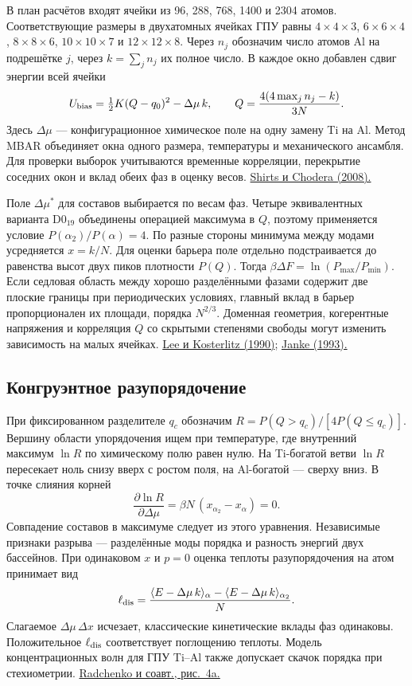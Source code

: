 \documentclass[11pt,a4paper]{article}
\begin{document}
В план расчётов входят ячейки из 96, 288, 768, 1400 и 2304 атомов. Соответствующие размеры в двухатомных ячейках ГПУ равны \(4{\times}4{\times}3\), \(6{\times}6{\times}4\), \(8{\times}8{\times}6\), \(10{\times}10{\times}7\) и \(12{\times}12{\times}8\). Через \(n_j\) обозначим число атомов Al на подрешётке \(j\), через \(k=\sum_jn_j\) их полное число. В каждое окно добавлен сдвиг энергии всей ячейки
\[
 U_{\rm bias}=\tfrac12 K(Q-q_0)^2-\Delta\mu\, k,\qquad
 Q=\frac{4(4\max_jn_j-k)}{3N}.
\]
Здесь \(\Delta\mu\) --- конфигурационное химическое поле на одну замену Ti на Al. Метод MBAR объединяет окна одного размера, температуры и механического ансамбля. Для проверки выборок учитываются временные корреляции, перекрытие соседних окон и вклад обеих фаз в оценку весов. \href{https://doi.org/10.1063/1.2978177}{Shirts и Chodera (2008).}

Поле \(\Delta\mu^*\) для составов выбирается по весам фаз. Четыре эквивалентных варианта D0$_{19}$ объединены операцией максимума в \(Q\), поэтому применяется условие \(P(\alpha_2)/P(\alpha)=4\). По разные стороны минимума между модами усредняется \(x=k/N\). Для оценки барьера поле отдельно подстраивается до равенства высот двух пиков плотности \(P(Q)\). Тогда \(\beta\Delta F=\ln(P_{\max}/P_{\min})\). Если седловая область между хорошо разделёнными фазами содержит две плоские границы при периодических условиях, главный вклад в барьер пропорционален их площади, порядка \(N^{2/3}\). Доменная геометрия, когерентные напряжения и корреляция \(Q\) со скрытыми степенями свободы могут изменить зависимость на малых ячейках. \href{https://doi.org/10.1103/PhysRevLett.65.137}{Lee и Kosterlitz (1990)}; \href{https://doi.org/10.1103/PhysRevB.47.14757}{Janke (1993).}

\subsection*{Конгруэнтное разупорядочение}
При фиксированном разделителе \(q_c\) обозначим \(R=P(Q>q_c)/[4P(Q\leq q_c)]\). Вершину области упорядочения ищем при температуре, где внутренний максимум \(\ln R\) по химическому полю равен нулю. На Ti-богатой ветви \(\ln R\) пересекает ноль снизу вверх с ростом поля, на Al-богатой --- сверху вниз. В точке слияния корней
\[
 \frac{\partial\ln R}{\partial\Delta\mu}=\beta N\,
      (x_{\alpha_2}-x_\alpha)=0.
\]
Совпадение составов в максимуме следует из этого уравнения. Независимые признаки разрыва --- разделённые моды порядка и разность энергий двух бассейнов. При одинаковом \(x\) и \(p=0\) оценка теплоты разупорядочения на атом принимает вид
\[
  \ell_{\rm dis} =
   \frac{\langle E-\Delta\mu\, k\rangle_\alpha -
         \langle E-\Delta\mu\, k\rangle_{\alpha_2}}{N}.
\]
Слагаемое \(\Delta\mu\,\Delta x\) исчезает, классические кинетические вклады фаз одинаковы. Положительное \(\ell_{\rm dis}\) соответствует поглощению теплоты. Модель концентрационных волн для ГПУ Ti--Al также допускает скачок порядка при стехиометрии. \href{https://arxiv.org/pdf/1406.0162}{Radchenko и соавт., рис.~4a.}
\end{document}
